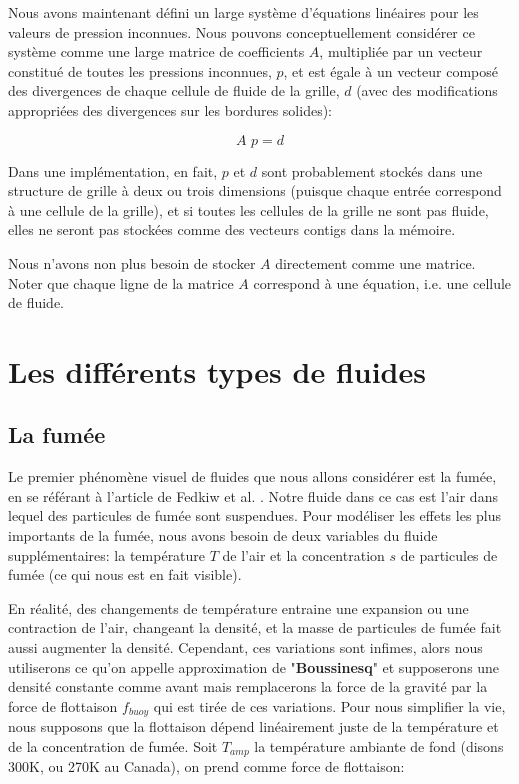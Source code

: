 \documentclass[11pt]{report}
\begin{document}
Nous avons maintenant défini un large système d'équations linéaires pour les valeurs de pression inconnues. Nous pouvons conceptuellement considérer ce système comme une large matrice de coefficients $A$, multipliée par un vecteur constitué de toutes les pressions inconnues, $p$, et est égale à un vecteur composé des divergences de chaque cellule de fluide de la grille, $d$ (avec des modifications appropriées des divergences sur les bordures solides):

\begin{equation}
A\,\, p = d
\end{equation} 

Dans une implémentation, en fait, $p$ et $d$ sont probablement stockés dans une structure de grille à deux ou trois dimensions (puisque chaque entrée correspond à une cellule de la grille), et si toutes les cellules de la grille ne sont pas fluide, elles ne seront pas stockées comme des vecteurs contigs dans la mémoire.

Nous n'avons non plus besoin de stocker $A$ directement comme une matrice. Noter que chaque ligne de la matrice $A$ correspond à une équation, i.e. une cellule de fluide.

\part{Les différents types de fluides}

\chapter{La fumée}

Le premier phénomène visuel de fluides que nous allons considérer est la fumée, en se référant à l'article de Fedkiw et al. \cite{fedkiw-stam-jensen-01}. Notre fluide dans ce cas est l'air dans lequel des particules de fumée sont suspendues. Pour modéliser les effets les plus importants de la fumée, nous avons besoin de deux variables du fluide supplémentaires: la température $T$ de l'air et la concentration $s$ de particules de fumée (ce qui nous est en fait visible).\newline

En réalité, des changements de température entraine une expansion ou une contraction de l'air, changeant la densité, et la masse de particules de fumée fait aussi augmenter la densité. Cependant, ces variations sont infimes, alors nous utiliserons ce qu'on appelle approximation de "\textbf{Boussinesq}" et supposerons une densité constante comme avant mais remplacerons la force de la gravité par la force de flottaison \textit{$f_{buoy}$} qui est tirée de ces variations. Pour nous simplifier la vie, nous supposons que la flottaison dépend linéairement juste de la température et de la concentration de fumée. Soit $T_{amp}$ la température ambiante de fond (disons 300K, ou 270K au Canada), on prend comme force de flottaison:
\end{document}

